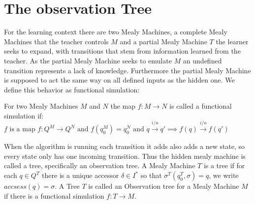 \section{The observation Tree}
For the learning context there are two Mealy Machines, a complete Mealy Machines that the teacher controls $M$ and a partial Mealy Machine $T$ the learner seeks to expand, with transitions that stem from information learned from the teacher. As the partial Mealy Machine seeks to emulate $M$ an undefined transition represents a lack of knowledge. Furthermore the partial Mealy Machine is supposed to act the same way on all defined inputs as the hidden one. We define this behavior as functional simulation:
\begin{definition}\label{def:funcsim}
 For two Mealy Machines $M$ and $N$ the map $f:M\rightarrow N$ is called a functional simulation if: $f\text{ is a map }f:Q^M\rightarrow Q^N \text{ and }
	f(q_0^M)=q_0^N \text{ and } q\xrightarrow{i/o}q' \implies f(q)\xrightarrow{i/o}f(q') 
 $
\end{definition} 
When the algorithm is running each transition it adds also adds a new state, so every state only has one incoming transition. Thus the hidden mealy machine is called a tree, specifically an observation tree.
A Mealy Machine $T$ is a tree if for each $q\in Q^T$ there is a unique accessor $\delta\in I^*$ so that $\sigma^T(q_0^T,\sigma)=q$, we write $accsess(q)=\sigma$. A Tree $T$ is called an Observation tree for a Mealy Machine $M$ if there is a functional simulation $f:T\rightarrow M$.



